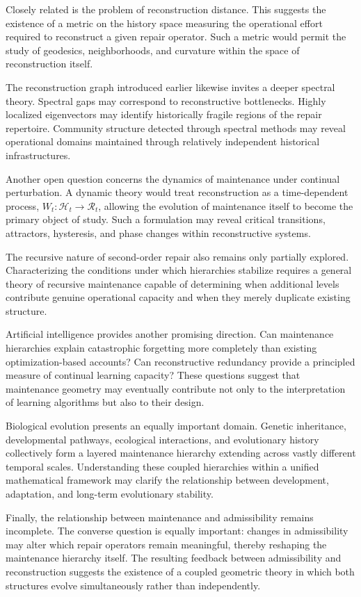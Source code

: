 \documentclass[12pt,oneside]{article}
\theoremstyle{plain}
\theoremstyle{definition}
\theoremstyle{remark}
\theoremstyle{plain}
\newcommand{\Hist}{\mathcal{H}}
\begin{document}
Closely related is the problem of reconstruction distance. This suggests the existence of a metric
on the history space measuring the operational effort required to reconstruct a given repair
operator. Such a metric would permit the study of geodesics, neighborhoods, and curvature within
the space of reconstruction itself.

The reconstruction graph introduced earlier likewise invites a deeper spectral theory. Spectral
gaps may correspond to reconstructive bottlenecks. Highly localized eigenvectors may identify
historically fragile regions of the repair repertoire. Community structure detected through spectral
methods may reveal operational domains maintained through relatively independent historical
infrastructures.

Another open question concerns the dynamics of maintenance under continual perturbation. A dynamic
theory would treat reconstruction as a time-dependent process, $W_t : \Hist_t \rightarrow
\mathcal{R}_t$, allowing the evolution of maintenance itself to become the primary object of
study. Such a formulation may reveal critical transitions, attractors, hysteresis, and phase
changes within reconstructive systems.

The recursive nature of second-order repair also remains only partially explored. Characterizing
the conditions under which hierarchies stabilize requires a general theory of recursive maintenance
capable of determining when additional levels contribute genuine operational capacity and when they
merely duplicate existing structure.

Artificial intelligence provides another promising direction. Can maintenance hierarchies explain
catastrophic forgetting more completely than existing optimization-based accounts? Can
reconstructive redundancy provide a principled measure of continual learning capacity? These
questions suggest that maintenance geometry may eventually contribute not only to the interpretation
of learning algorithms but also to their design.

Biological evolution presents an equally important domain. Genetic inheritance, developmental
pathways, ecological interactions, and evolutionary history collectively form a layered maintenance
hierarchy extending across vastly different temporal scales. Understanding these coupled hierarchies
within a unified mathematical framework may clarify the relationship between development,
adaptation, and long-term evolutionary stability.

Finally, the relationship between maintenance and admissibility remains incomplete. The converse
question is equally important: changes in admissibility may alter which repair operators remain
meaningful, thereby reshaping the maintenance hierarchy itself. The resulting feedback between
admissibility and reconstruction suggests the existence of a coupled geometric theory in which both
structures evolve simultaneously rather than independently.
\end{document}
